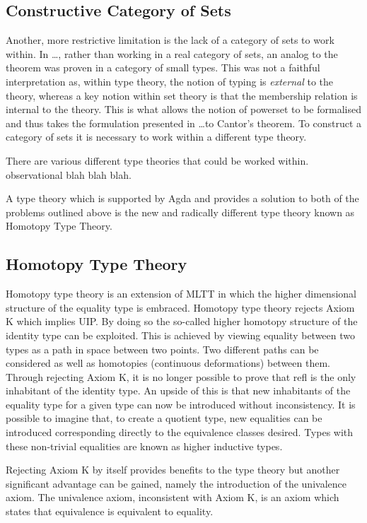\subsection{Constructive Category of Sets}
Another, more restrictive limitation is the lack of a category of sets to work
within. In \ldots {}, rather than working in a
real category of sets, an analog to the theorem was proven in a category of
small types. This was not a faithful interpretation as, within type theory, the
notion of typing is \textit{external} to the theory, whereas a key notion within
set theory is that the membership relation is internal to the theory. This is
what allows the notion of powerset to be formalised and thus takes the
formulation presented in \ldots to Cantor's theorem. To construct a category of
sets it is necessary to work within a different type theory.

There are various different type theories that could be worked within.
observational blah blah blah.

A type theory which is supported by Agda and provides a solution to both of the
problems outlined above is the new and radically different type theory known as
Homotopy Type Theory.

\subsection{Homotopy Type Theory}

Homotopy type theory is an extension of MLTT in which the
higher dimensional structure of the equality type is embraced. Homotopy type
theory rejects \textsf{Axiom K} which implies UIP. By doing so the so-called higher
homotopy structure of the identity type can be exploited. This is achieved by
viewing equality between two types as a path in space between two points. Two
different paths can be considered as well as homotopies (continuous
deformations) between them. Through rejecting \textsf{Axiom K}, it is no longer
possible to prove that \textsf{refl} is the only inhabitant of the identity
type. An upside of this is that new inhabitants of the equality type for a given
type can now be introduced without inconsistency. It is possible to imagine
that, to create a quotient type, new equalities can be introduced corresponding
directly to the equivalence classes desired. Types with these non-trivial
equalities are known as higher inductive types.

Rejecting \textsf{Axiom K} by itself provides benefits to the type theory but
another significant advantage can be gained, namely the introduction of the
univalence axiom. The univalence axiom, inconsistent with
\textsf{Axiom K}, is an axiom which states that equivalence is equivalent to
equality.

